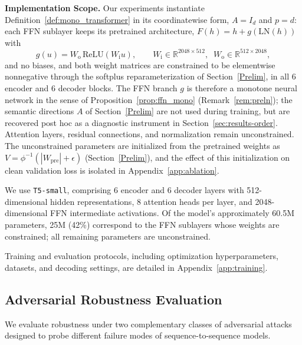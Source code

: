 \documentclass{article}
\theoremstyle{plain}
\theoremstyle{definition}
\theoremstyle{remark}
\begin{document}
\textbf{Implementation Scope.}
Our experiments instantiate Definition~\ref{def:mono_transformer} in its
coordinatewise form, $A = I_d$ and $p = d$: each FFN sublayer keeps its pretrained
architecture, $F(h) = h + g(\mathrm{LN}(h))$ with
\[
g(u) = W_{\mathrm{o}}\,\mathrm{ReLU}(W_{\mathrm{i}} u), \qquad
W_{\mathrm{i}}\in\mathbb{R}^{2048\times 512},\;\; W_{\mathrm{o}}\in\mathbb{R}^{512\times 2048},
\]
and no biases, and both weight matrices are constrained to be elementwise
nonnegative through the softplus reparameterization of Section~\ref{Prelim}, in
all 6 encoder and 6 decoder blocks. The FFN branch $g$ is therefore a monotone
neural network in the sense of Proposition~\ref{prop:ffn_mono}
(Remark~\ref{rem:preln}); the semantic directions $A$ of Section~\ref{Prelim}
are not used during training, but are recovered post hoc as a diagnostic
instrument in Section~\ref{sec:results-order}. Attention layers, residual
connections, and normalization remain unconstrained. The unconstrained parameters
are initialized from the pretrained weights as
$V = \phi^{-1}(|W_{\mathrm{pre}}| + \epsilon)$ (Section~\ref{Prelim}), and the
effect of this initialization on clean validation loss is isolated in Appendix~\ref{app:ablation}.

We use \texttt{T5-small}, comprising 6 encoder and 6 decoder layers with 512-dimensional hidden representations, 8 attention heads per layer, and 2048-dimensional FFN intermediate activations. Of the model's approximately 60.5M parameters, 25M (42\%) correspond to the FFN sublayers whose weights are constrained; all remaining parameters are unconstrained.

Training and evaluation protocols, including optimization hyperparameters, datasets, and decoding settings, are detailed in Appendix~\ref{app:training}.

\subsection{Adversarial Robustness Evaluation}
\label{sec:setup-attacks}
We evaluate robustness under two complementary classes of adversarial attacks designed to probe different failure modes of sequence-to-sequence models.
\end{document}

